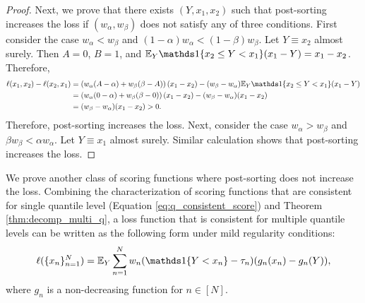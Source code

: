 \begin{proof}
Next, we prove that there exists $(Y, x_1, x_2)$ such that post-sorting increases the loss if $(w_\alpha, w_\beta)$ does not satisfy any of three conditions. First consider the case $w_\alpha < w_\beta$ and $(1-\alpha)w_\alpha < (1-\beta)w_\beta$. Let $Y \equiv x_2$ almost surely. Then $A = 0$, $B = 1$, and $\E_Y \indi{x_2 \leq Y < x_1}(x_1 - Y) = x_1 - x_2$. Therefore,
\begin{align*}
\ell(x_1, x_2) - \ell(x_2, x_1) 
& = \left(w_\alpha(A-\alpha) + w_\beta(\beta-A)\right)(x_1 - x_2) - (w_\beta - w_\alpha)\E_Y \indi{x_2 \leq Y < x_1}(x_1 - Y) \\
& = \left(w_\alpha(0-\alpha) + w_\beta(\beta-0)\right)(x_1 - x_2) - (w_\beta - w_\alpha)(x_1 - x_2) \\
& = (w_\beta - w_\alpha)(x_1 - x_2) > 0.
\end{align*}
Therefore, post-sorting increases the loss. Next, consider the case $w_\alpha > w_\beta$ and $\beta w_\beta < \alpha w_\alpha$. Let $Y \equiv x_1$ almost surely. Similar calculation shows that post-sorting increases the loss.
\end{proof}



We prove another class of scoring functions where post-sorting does not increase the loss. Combining the characterization of scoring functions that are consistent for single quantile level (Equation \eqref{eq:q_consistent_score}) and Theorem \ref{thm:decomp_multi_q}, a loss function that is consistent for multiple quantile levels can be written as the following form under mild regularity conditions:
\begin{align} \label{eq:multi_q_consistent_loss}
\ell(\{x_n\}_{n=1}^N) = \E_Y \sum_{n=1}^{N} w_n (\indi{Y < x_n} - \tau_n)(g_n(x_n) - g_n(Y)),  
\end{align}
where $g_n$ is a non-decreasing function for $n \in [N]$.


